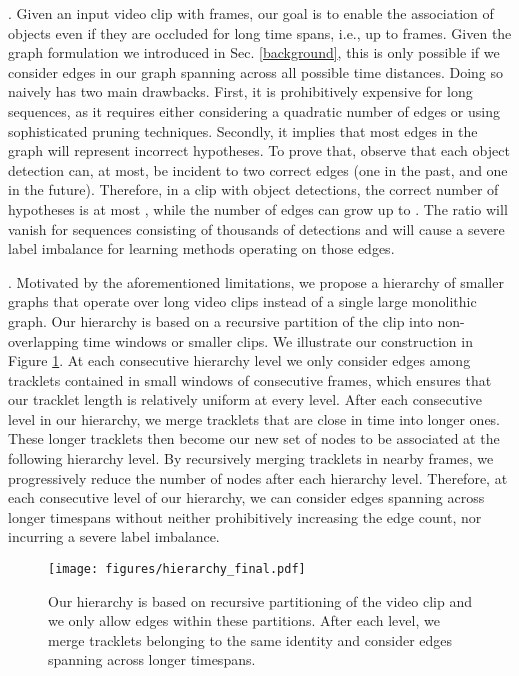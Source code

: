\documentclass[10pt,twocolumn,letterpaper]{article}
\begin{document}
{{. 
Given an input video clip with  frames, our goal is to enable the association of objects even if they are occluded for long time spans, i.e., up to  frames.
Given the graph formulation we introduced in Sec. \ref{background}, this is only possible if we consider edges in our graph spanning across all possible time distances. Doing so naively has two main drawbacks. First, it is prohibitively expensive for long sequences, as it requires either considering a quadratic number of edges or using sophisticated pruning techniques. 
Secondly, it  implies that most edges in the graph will represent incorrect hypotheses. To prove that, observe that each object detection can, at most, be incident to two correct edges (one in the past, and one in the future). Therefore, in a clip with  object detections, the correct number of hypotheses is at most , while the number of edges can grow up to  . The ratio   will vanish for sequences consisting of thousands of detections and will cause a severe label imbalance for learning methods operating on those edges.




. Motivated by the aforementioned limitations, we  propose a hierarchy of smaller graphs that operate over long video clips instead of a single large monolithic graph. 
Our hierarchy is based on a recursive partition of the clip into non-overlapping time windows or smaller clips. We illustrate our construction in Figure \ref{fig:hierarchy}. At each consecutive hierarchy level we only consider edges among tracklets contained in small windows of consecutive frames, which ensures that our tracklet length is relatively uniform at every level. After each consecutive level in our hierarchy, we merge tracklets that are close in time into longer ones. These longer tracklets then become our new set of nodes to be associated at the following hierarchy level. By recursively merging tracklets in nearby frames, we progressively reduce the number of nodes after each hierarchy level. 
Therefore, at each consecutive level of our hierarchy, we can consider edges spanning across longer timespans without neither prohibitively increasing the edge count, nor incurring a severe label imbalance. 










\begin{figure}
\centering
\texttt{[image: figures/hierarchy\_final.pdf]}
\caption{ Our hierarchy is based on recursive partitioning of the video clip and we only allow edges within these partitions. After each level, we merge tracklets belonging to the same identity and consider edges spanning across longer timespans. }
\label{fig:hierarchy}
\end{figure}

}}
\end{document}
